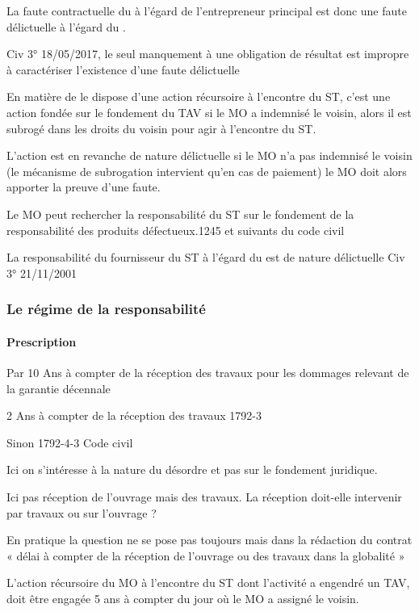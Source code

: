 			La faute contractuelle du \ST à l’égard de l’entrepreneur principal est donc une faute délictuelle à l'égard du \Mo.

			Civ 3° 18/05/2017, le seul manquement à une obligation de résultat est impropre à caractériser l’existence d’une faute délictuelle

			En matière de \TAV le \MO dispose d’une action récursoire à l’encontre du ST, c’est une action fondée sur le fondement du TAV si le MO a indemnisé le voisin, alors il est subrogé dans les droits du voisin pour agir à l’encontre du ST.

			L’action est en revanche de nature délictuelle si le MO n’a pas indemnisé le voisin (le mécanisme de subrogation intervient qu’en cas de paiement) le MO doit alors apporter la preuve d’une faute.

			Le MO peut rechercher la responsabilité du ST sur le fondement de la responsabilité des produits défectueux.1245 et suivants du code civil

			La responsabilité du fournisseur du ST à l’égard du \MO est de nature délictuelle Civ 3° 21/11/2001



		\subsubsection{Le régime de la responsabilité}

			\paragraph{Prescription}
			Par 10 Ans à compter de la réception des travaux pour les dommages relevant de la garantie décennale

			2 Ans à compter de la réception des travaux 1792-3

			Sinon 1792-4-3 Code civil

			Ici on s’intéresse à la nature du désordre et pas sur le fondement juridique.

			Ici pas réception de l’ouvrage mais des travaux. La réception doit-elle intervenir par travaux ou sur l’ouvrage ?

			En pratique la question ne se pose pas toujours mais dans la rédaction du contrat « délai à compter de la réception de l’ouvrage ou des travaux dans la globalité »

			L’action récursoire du MO à l’encontre du ST dont l’activité a engendré un TAV, doit être engagée 5 ans à compter du jour où le MO a assigné le voisin.

